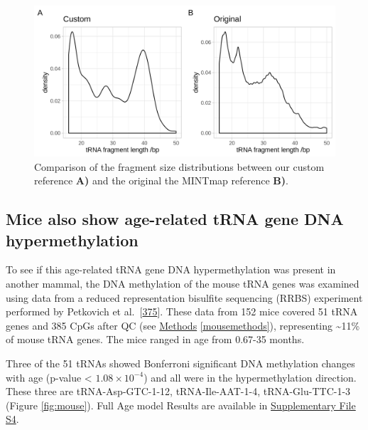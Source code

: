 \documentclass[
]{book}
\begin{document}
\begin{figure}

{\centering \includegraphics[width=1\linewidth]{./figs/combinedFragSizeDists} 

}

\caption{Comparison of the fragment size distributions between our custom reference \textbf{A)} and the original the MINTmap reference \textbf{B)}.}\label{fig:combinedFragSizeDists}
\end{figure}



\hypertarget{mice-also-show-age-related-trna-gene-dna-hypermethylation}{%
\subsection{Mice also show age-related tRNA gene DNA hypermethylation}\label{mice-also-show-age-related-trna-gene-dna-hypermethylation}}

To see if this age-related tRNA gene DNA hypermethylation was present in another mammal, the DNA methylation of the mouse tRNA genes was examined using data from a reduced representation bisulfite sequencing (RRBS) experiment performed by Petkovich et al.~{[}\protect\hyperlink{ref-Petkovich2017}{375}{]}.
These data from 152 mice covered 51 tRNA genes and 385 CpGs after QC (see \protect\hyperlink{mousemethods}{Methods} \ref{mousemethods}), representing \textasciitilde11\% of mouse tRNA genes.
The mice ranged in age from 0.67-35 months.

Three of the 51 tRNAs showed Bonferroni significant DNA methylation changes with age (p-value \textless{} \(1.08 \times 10^{-4}\)) and all were in the hypermethylation direction.
These three are tRNA-Asp-GTC-1-12, tRNA-Ile-AAT-1-4, tRNA-Glu-TTC-1-3 (Figure \ref{fig:mouse}). Full Age model Results are available in \href{Supplementary_Files/SF4_mouse_tRNA_age_models.xlsx}{Supplementary File S4}.
\end{document}
